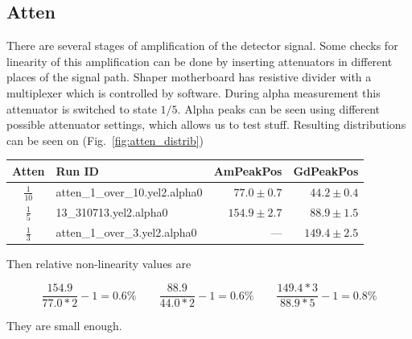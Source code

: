 \documentclass[a4paper,12pt]{article}
\begin{document}
\subsection{Atten}

There are several stages of amplification of the detector signal. Some checks
for linearity of this amplification can be done by inserting attenuators in
different places of the signal path. Shaper motherboard has resistive divider
with a multiplexer which is controlled by software. During alpha measurement
this attenuator is switched to state $1/5$. Alpha peaks can be seen using
different possible attenuator settings, which allows us to test stuff.
Resulting distributions can be seen on (Fig.~\ref{fig:atten_distrib})

\begin{tabular}{clrr}
\toprule
Atten   &       Run ID & AmPeakPos      & GdPeakPos \\
\midrule
$\frac{1}{10}$  & \small{atten\_1\_over\_10.yel2.alpha0}        & $77.0\pm0.7$          & $44.2\pm0.4$ \\
\addlinespace
$\frac{1}{5}$   & \small{13\_310713.yel2.alpha0}                & $154.9\pm2.7$         & $88.9\pm1.5$ \\
\addlinespace
$\frac{1}{3}$   & \small{atten\_1\_over\_3.yel2.alpha0}         & ---\hspace{20pt}      & $149.4\pm2.5$ \\
\bottomrule
\end{tabular}

Then relative non-linearity values are

\begin{equation}
\frac{154.9}{77.0*2} - 1 = 0.6\%
\qquad
\frac{88.9}{44.0*2} - 1 = 0.6\%
\qquad
\frac{149.4*3}{88.9*5} - 1 = 0.8\%
\end{equation}

They are small enough.
\end{document}
